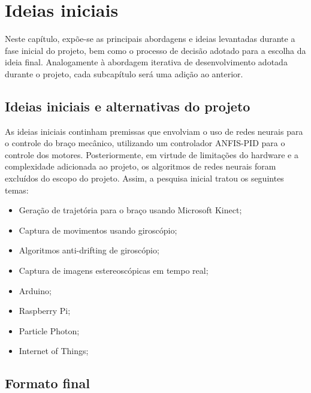 
	\setlength{\absparsep}{18pt} %
	\chapter{Ideias iniciais}\label{cap-ideiasiniciais}
	
	Neste capítulo, expõe-se as principais abordagens e ideias levantadas durante a
	fase inicial do projeto, bem como o processo de decisão adotado para a escolha da ideia final. Analogamente à abordagem iterativa de desenvolvimento adotada durante o projeto, cada subcapítulo será uma adição ao anterior.\par
	
	\section{Ideias iniciais e alternativas do projeto}\label{subsec-iniciais}

	As ideias iniciais continham premissas que envolviam o uso de redes neurais para o controle do braço mecânico, utilizando um controlador ANFIS-PID para o controle dos motores.
Posteriormente, em virtude de limitações do hardware e a complexidade adicionada ao projeto, os algoritmos de redes neurais foram excluídos do escopo do projeto. Assim, a pesquisa inicial tratou os seguintes temas:\par


\begin{itemize}[noitemsep]
	\item Geração de trajetória para o braço usando Microsoft Kinect;
	\item Captura de movimentos usando giroscópio;
	\item Algoritmos anti-drifting de giroscópio;
	\item Captura de imagens estereoscópicas em tempo real;
	\item Arduino;
	\item Raspberry Pi;
	\item Particle Photon;
	\item Internet of Things;
\end{itemize}

\section{Formato final}\label{subsec-formatofinal}

